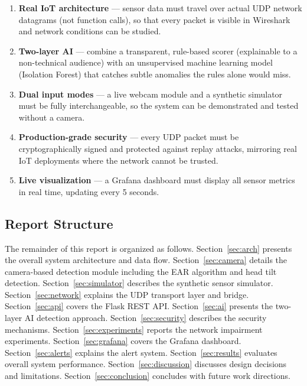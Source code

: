 \documentclass[12pt, a4paper]{article}
\begin{document}
\begin{enumerate}
    \item \textbf{Real IoT architecture} — sensor data must travel over actual
          UDP network datagrams (not function calls), so that every packet is
          visible in Wireshark and network conditions can be studied.

    \item \textbf{Two-layer AI} — combine a transparent, rule-based scorer
          (explainable to a non-technical audience) with an unsupervised
          machine learning model (Isolation Forest) that catches subtle
          anomalies the rules alone would miss.

    \item \textbf{Dual input modes} — a live webcam module and a synthetic
          simulator must be fully interchangeable, so the system can be
          demonstrated and tested without a camera.

    \item \textbf{Production-grade security} — every UDP packet must be
          cryptographically signed and protected against replay attacks,
          mirroring real IoT deployments where the network cannot be trusted.

    \item \textbf{Live visualization} — a Grafana dashboard must display all
          sensor metrics in real time, updating every 5 seconds.
\end{enumerate}

\subsection{Report Structure}

The remainder of this report is organized as follows.
Section~\ref{sec:arch} presents the overall system architecture and data flow.
Section~\ref{sec:camera} details the camera-based detection module including
the EAR algorithm and head tilt detection.
Section~\ref{sec:simulator} describes the synthetic sensor simulator.
Section~\ref{sec:network} explains the UDP transport layer and bridge.
Section~\ref{sec:api} covers the Flask REST API.
Section~\ref{sec:ai} presents the two-layer AI detection approach.
Section~\ref{sec:security} describes the security mechanisms.
Section~\ref{sec:experiments} reports the network impairment experiments.
Section~\ref{sec:grafana} covers the Grafana dashboard.
Section~\ref{sec:alerts} explains the alert system.
Section~\ref{sec:results} evaluates overall system performance.
Section~\ref{sec:discussion} discusses design decisions and limitations.
Section~\ref{sec:conclusion} concludes with future work directions.
\end{document}
